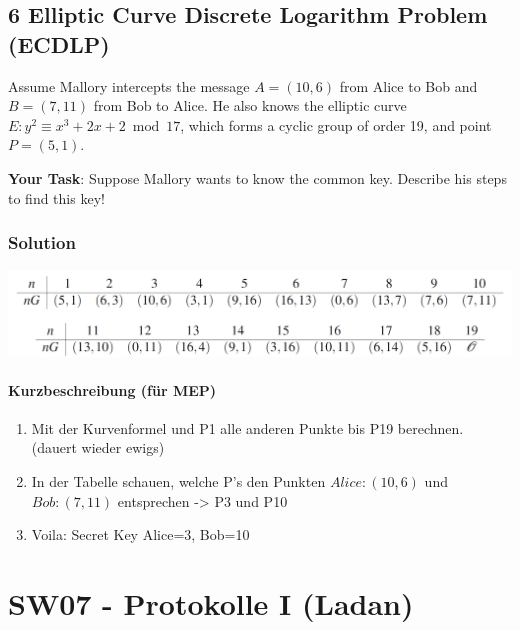 \documentclass[11pt]{article}
\begin{document}
    \hypertarget{elliptic-curve-discrete-logarithm-problem-ecdlp}{%
\subsection{6 Elliptic Curve Discrete Logarithm Problem
(ECDLP)}\label{elliptic-curve-discrete-logarithm-problem-ecdlp}}

Assume Mallory intercepts the message \(A = (10,6)\) from Alice to Bob
and \(B = (7,11)\) from Bob to Alice. He also knows the elliptic curve
\(E : y^2 \equiv x^3 +2x+2 \bmod 17\), which forms a cyclic group of
order 19, and point \(P = (5,1)\).

\textbf{Your Task}: Suppose Mallory wants to know the common key.
Describe his steps to find this key!

\hypertarget{solution}{%
\subsubsection{Solution}\label{solution}}

\begin{center}
	\includegraphics[scale=0.8]{img/p19Tabelle.png}
\end{center}

\hypertarget{kurzbeschreibung-fuxfcr-mep}{%
\paragraph{Kurzbeschreibung (für
MEP)}\label{kurzbeschreibung-fuxfcr-mep}}

\begin{enumerate}
\def\labelenumi{\arabic{enumi}.}
\item
  Mit der Kurvenformel und P1 alle anderen Punkte bis P19 berechnen.
  (dauert wieder ewigs)
\item
  In der Tabelle schauen, welche P's den Punkten \(Alice: (10,6)\) und
  \(Bob: (7, 11)\) entsprechen -\textgreater{} P3 und P10
\item
  Voila: Secret Key Alice=3, Bob=10
\end{enumerate}

    

    \hypertarget{sw07---protokolle-i-ladan}{%
\section{SW07 - Protokolle I (Ladan)}\label{sw07---protokolle-i-ladan}}
\end{document}
